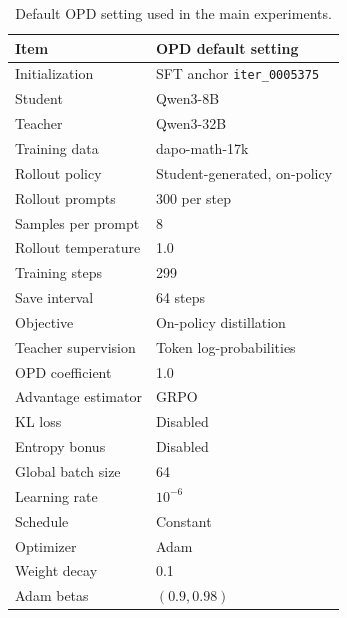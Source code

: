 \documentclass{llmxive}
\providecommand{\arraystretch}{1.05}
\begin{document}
\begin{table}[t]
\centering
\small
\setlength{\tabcolsep}{4pt}
\renewcommand{\arraystretch}{1.08}
\begin{tabularx}{\linewidth}{@{}lX@{}}
\toprule
\textbf{Item} & \textbf{OPD default setting} \\
\midrule
Initialization & SFT anchor \texttt{iter\_0005375} \\
Student & Qwen3-8B \\
Teacher & Qwen3-32B \\
Training data & dapo-math-17k  \\
Rollout policy & Student-generated, on-policy \\
Rollout prompts & 300 per step \\
Samples per prompt & 8 \\
Rollout temperature & 1.0 \\
Training steps & 299 \\
Save interval & 64 steps \\
Objective & On-policy distillation \\
Teacher supervision & Token log-probabilities \\
OPD coefficient & 1.0 \\
Advantage estimator & GRPO \\
KL loss & Disabled \\
Entropy bonus & Disabled \\
Global batch size & 64 \\
Learning rate & $10^{-6}$ \\
Schedule & Constant \\
Optimizer & Adam \\
Weight decay & 0.1 \\
Adam betas & $(0.9,0.98)$ \\
\bottomrule
\end{tabularx}
\caption{Default OPD setting used in the main experiments.}
\label{tab:opd-default-setting}
\end{table}
\end{document}
